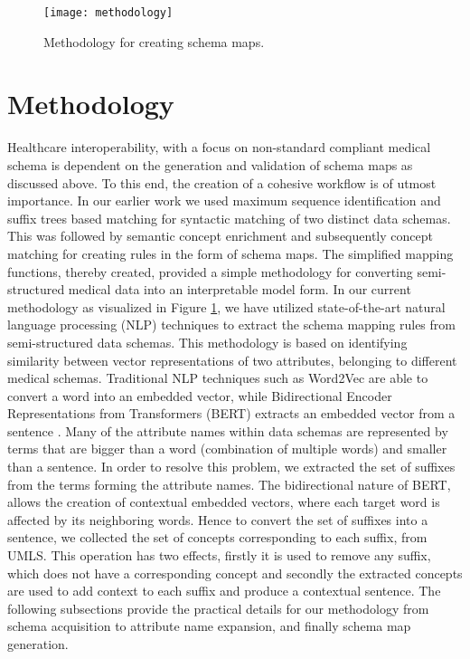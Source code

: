 \documentclass{ieeeaccess}
\begin{document}
\begin{figure}[t!]
	\centering
	\texttt{[image: methodology]}
	\caption{Methodology for creating schema maps.}
	\label{fig:methodology}
\end{figure} 

\section{Methodology}
\label{methodology}
Healthcare interoperability, with a focus on non-standard compliant medical schema is dependent on the generation and validation of schema maps as discussed above. To this end, the creation of a cohesive workflow is of utmost importance. In our earlier work \cite{Satti2020} we used maximum sequence identification and suffix trees based matching for syntactic matching of two distinct data schemas. This was followed by semantic concept enrichment and subsequently concept matching for creating rules in the form of schema maps. The simplified mapping functions, thereby created, provided a simple methodology for converting semi-structured medical data into an interpretable model form.
In our current methodology as visualized in Figure \ref{fig:methodology}, we have utilized state-of-the-art natural language processing (NLP) techniques to extract the schema mapping rules from semi-structured data schemas. This methodology is based on identifying similarity between vector representations of two attributes, belonging to different medical schemas. 
Traditional NLP techniques such as Word2Vec are able to convert a word into an embedded vector, while Bidirectional Encoder Representations from Transformers (BERT) extracts an embedded vector from a sentence \cite{zhu2018exploring}. Many of the attribute names within data schemas are represented by terms that are bigger than a word (combination of multiple words) and smaller than a sentence. In order to resolve this problem, we extracted the set of suffixes from the terms forming the attribute names. The bidirectional nature of BERT, allows the creation of contextual embedded vectors, where each target word is affected by its neighboring words. Hence to convert the set of suffixes into a sentence, we collected the set of concepts corresponding to each suffix, from UMLS. This operation has two effects, firstly it is used to remove any suffix, which does not have a corresponding concept and secondly the extracted concepts are used to add context to each suffix and produce a contextual sentence. 
The following subsections provide the practical details for our methodology from schema acquisition to attribute name expansion, and finally schema map generation.
\end{document}
